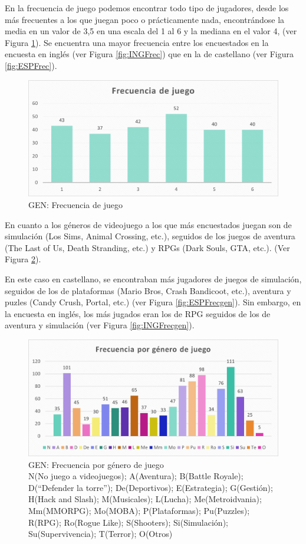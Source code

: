 \documentclass[12pt, a4paper,twoside,titlepage]{book}
\begin{document}
En la frecuencia de juego podemos encontrar todo tipo de jugadores, desde los más frecuentes a los que juegan poco o prácticamente nada, encontrándose la media en un valor de 3,5 en una escala del 1 al 6 y la mediana en el valor 4, (ver Figura \ref{fig:Frec}). Se encuentra una mayor frecuencia entre los encuestados en la encuesta en inglés (ver Figura \ref{fig:INGFrec}) que en la de castellano (ver Figura \ref{fig:ESPFrec}).

\begin{figure}
\centering
 \includegraphics[width=.7\linewidth]{Imagenes Form GEN/3GENFrec}
 \caption{GEN: Frecuencia de juego}
 \label{fig:Frec}
 \end{figure}
 
En cuanto a los géneros de videojuego a los que más encuestados juegan son de simulación (Los Sims, Animal Crossing, etc.), seguidos de los juegos de aventura (The Last of Us, Death Stranding, etc.)  y RPGs (Dark Souls, GTA, etc.). (Ver Figura \ref{fig:Frecgen}). 

En este caso en castellano, se encontraban más jugadores de juegos de simulación, seguidos de los de plataformas (Mario Bros, Crash Bandicoot, etc.), aventura y puzles (Candy Crush, Portal, etc.) (ver Figura \ref{fig:ESPFrecgen}). Sin embargo, en la encuesta en inglés, los más jugados eran los de RPG seguidos de los de aventura y simulación (ver Figura \ref{fig:INGFrecgen}).  


\begin{figure}
\centering
 \includegraphics[width=.8\linewidth]{Imagenes Form GEN/4GENGen}
 \caption{GEN: Frecuencia por género de juego \\
 \small{N(No juego a videojuegos); A(Aventura); B(Battle Royale); D(“Defender la torre”); De(Deportivos); E(Estrategia); G(Gestión); H(Hack and Slash); M(Musicales); L(Lucha); Me(Metroidvania); Mm(MMORPG); Mo(MOBA); P(Plataformas); Pu(Puzzles); R(RPG); Ro(Rogue Like); S(Shooters); Si(Simulación); Su(Supervivencia); T(Terror); O(Otros)}}
 \label{fig:Frecgen}
 \end{figure}
 
\end{document}
